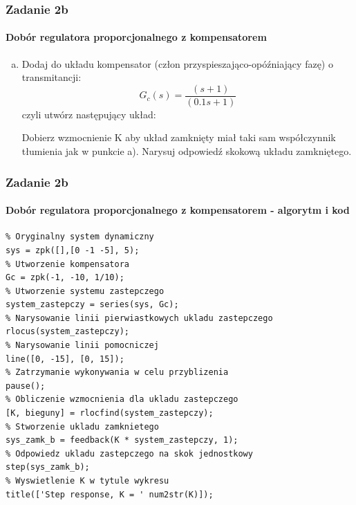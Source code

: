 \documentclass{beamer}
\begin{document}
\begin{frame}\frametitle{Zadanie 2b}\framesubtitle{Dobór regulatora proporcjonalnego z kompensatorem}
	\begin{enumerate}[b)]
		\item Dodaj do układu kompensator (człon przyspieszająco-opóźniający fazę) o transmitancji:
		\[
			G_c(s) = \frac{(s+1)}{(0.1s+1)}
		\]	
		czyli utwórz następujący układ:
		
		
		
		
		\flushleft Dobierz wzmocnienie K aby układ zamknięty miał taki sam współczynnik tłumienia jak w punkcie a). Narysuj odpowiedź skokową układu zamkniętego.
	\end{enumerate}
\end{frame}

\begin{frame}[fragile]\frametitle{Zadanie 2b}\framesubtitle{Dobór regulatora proporcjonalnego z kompensatorem - algorytm i kod}
	\begin{lstlisting}
% Oryginalny system dynamiczny
sys = zpk([],[0 -1 -5], 5);
% Utworzenie kompensatora
Gc = zpk(-1, -10, 1/10);
% Utworzenie systemu zastepczego
system_zastepczy = series(sys, Gc);
% Narysowanie linii pierwiastkowych ukladu zastepczego
rlocus(system_zastepczy);
% Narysowanie linii pomocniczej
line([0, -15], [0, 15]);
% Zatrzymanie wykonywania w celu przyblizenia
pause();
% Obliczenie wzmocnienia dla ukladu zastepczego
[K, bieguny] = rlocfind(system_zastepczy);
% Stworzenie ukladu zamknietego
sys_zamk_b = feedback(K * system_zastepczy, 1);
% Odpowiedz ukladu zastepczego na skok jednostkowy
step(sys_zamk_b);
% Wyswietlenie K w tytule wykresu
title(['Step response, K = ' num2str(K)]);
	\end{lstlisting}
\end{frame}
\end{document}
